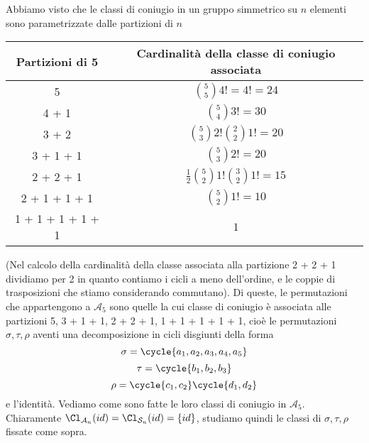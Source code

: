 \documentclass[11pt]{scrartcl}
\begin{document}
Abbiamo visto che le classi di coniugio in un gruppo simmetrico su $n$ elementi
sono parametrizzate dalle partizioni di $n$
\begingroup
\renewcommand{\arraystretch}{2}
\begin{center}
    \begin{tabular}{c|c}
        Partizioni di 5 & Cardinalità della classe di coniugio associata\\
        \hline
        5 & $\displaystyle\binom{5}{5}4! = 4! = 24$\\
        4 + 1 & $\displaystyle\binom{5}{4}3! = 30$\\
        3 + 2 & $\displaystyle\binom{5}{3}2!\binom{2}{2}1! = 20$\\
        3 + 1 + 1 & $\displaystyle\binom{5}{3}2! = 20$\\
        2 + 2 + 1 & $\displaystyle\frac 1 2\binom{5}{2}1!\binom{3}{2}1! = 15$\\
        2 + 1 + 1 + 1 & $\displaystyle\binom{5}{2}1! = 10$\\
        1 + 1 + 1 + 1 + 1 & $1$
    \end{tabular}
\end{center}
\endgroup
(Nel calcolo della cardinalità della classe associata alla partizione 2 + 2 + 1
dividiamo per 2 in quanto contiamo i cicli a meno dell'ordine, e
le coppie di trasposizioni che stiamo considerando commutano).
Di queste, le permutazioni che appartengono a $\mathcal{A}_5$ sono quelle
la cui classe di coniugio è associata alle partizioni 5, 3 + 1 + 1, 
2 + 2 + 1, 1 + 1 + 1 + 1 + 1, cioè le permutazioni $\sigma, \tau, \rho$
aventi una decomposizione in cicli disgiunti della forma
\[
    \sigma = \cycle{a_1, a_2, a_3, a_4, a_5}
\]
\[
    \tau = \cycle{b_1, b_2, b_3}
\]
\[
    \rho = \cycle{c_1, c_2}\cycle{d_1, d_2}
\]
e l'identità. Vediamo come sono fatte le loro classi di coniugio in $\mathcal{A}_5$.
Chiaramente $\Cl_{\mathcal{A}_n}(id) = \Cl_{\mathcal{S}_n}(id) = \{id\}$, studiamo quindi
le classi di $\sigma, \tau, \rho$ fissate come sopra.
\end{document}
